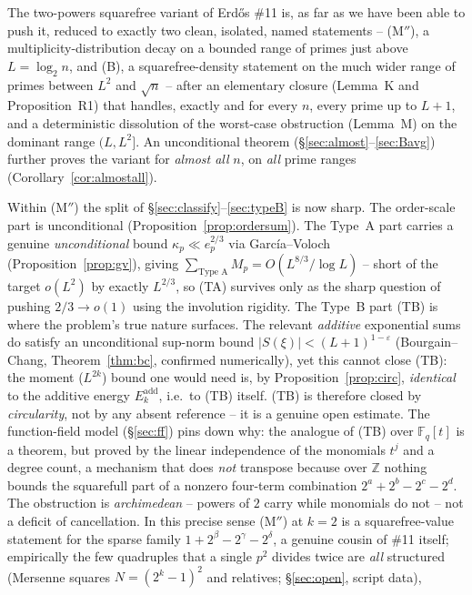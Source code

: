 \documentclass[11pt]{article}
\theoremstyle{plain}
\theoremstyle{definition}
\theoremstyle{remark}
\newcommand{\Z}{\mathbb{Z}}
\newcommand{\F}{\mathbb{F}}
\newcommand{\ep}{e_p}
\begin{document}
The two-powers squarefree variant of Erd\H{o}s \#11 is, as far as we have
been able to push it, reduced to exactly two clean, isolated, named
statements -- (M$''$), a multiplicity-distribution decay on a bounded range
of primes just above $L=\log_2n$, and (B), a squarefree-density statement on
the much wider range of primes between $L^2$ and $\sqrt n$ -- after an
elementary closure (Lemma~K and Proposition~R1) that handles, exactly and for
every $n$, every prime up to $L+1$, and a deterministic dissolution of the
worst-case obstruction (Lemma~M) on the dominant range $(L,L^2]$. An
unconditional theorem (\S\ref{sec:almost}--\ref{sec:Bavg}) further proves the
variant for \emph{almost all} $n$, on \emph{all} prime ranges
(Corollary~\ref{cor:almostall}).

Within (M$''$) the split of \S\ref{sec:classify}--\ref{sec:typeB} is now sharp.
The order-scale part is unconditional (Proposition~\ref{prop:ordersum}). The
Type~A part carries a genuine \emph{unconditional} bound $\kappa_p\ll\ep^{2/3}$
via García--Voloch (Proposition~\ref{prop:gv}), giving $\sum_{\text{Type A}}M_p=
O(L^{8/3}/\log L)$ -- short of the target $o(L^2)$ by exactly $L^{2/3}$, so (TA)
survives only as the sharp question of pushing $2/3\to o(1)$ using the involution
rigidity. The Type~B part (TB) is where the problem's true nature surfaces. The
relevant \emph{additive} exponential sums do satisfy an unconditional sup-norm
bound $|S(\xi)|<(L+1)^{1-\varepsilon}$ (Bourgain--Chang, Theorem~\ref{thm:bc},
confirmed numerically), yet this cannot close (TB): the moment ($L^{2k}$) bound
one would need is, by Proposition~\ref{prop:circ}, \emph{identical} to the
additive energy $E_k^{\mathrm{add}}$, i.e.\ to (TB) itself. (TB) is therefore
closed by \emph{circularity}, not by any absent reference -- it is a genuine open
estimate. The function-field model (\S\ref{sec:ff}) pins down why: the analogue
of (TB) over $\F_q[t]$ is a theorem, but proved by the linear independence of the
monomials $t^j$ and a degree count, a mechanism that does \emph{not} transpose
because over $\Z$ nothing bounds the squarefull part of a nonzero four-term
combination $2^a+2^b-2^c-2^d$. The obstruction is \emph{archimedean} -- powers of
$2$ carry while monomials do not -- not a deficit of cancellation. In this precise
sense (M$''$) at $k=2$ is a squarefree-value statement for the sparse family
$1+2^\beta-2^\gamma-2^\delta$, a genuine cousin of \#11 itself; empirically the
few quadruples that a single $p^2$ divides twice are \emph{all} structured
(Mersenne squares $N=(2^k-1)^2$ and relatives; \S\ref{sec:open}, script data),
\end{document}
